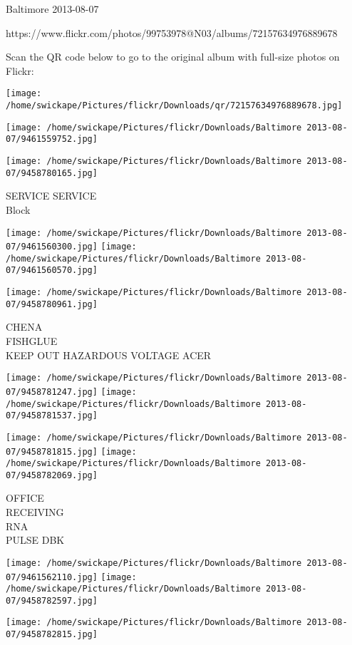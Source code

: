 \documentclass[10pt,letterpaper]{article}
\begin{document}
Baltimore 2013-08-07

https://www.flickr.com/photos/99753978@N03/albums/72157634976889678

Scan the QR code below to go to the original album with full-size photos on Flickr:

\texttt{[image: /home/swickape/Pictures/flickr/Downloads/qr/72157634976889678.jpg]}
\pagebreak

\texttt{[image: /home/swickape/Pictures/flickr/Downloads/Baltimore 2013-08-07/9461559752.jpg]}

\vspace{0.25in}
\texttt{[image: /home/swickape/Pictures/flickr/Downloads/Baltimore 2013-08-07/9458780165.jpg]}

SERVICE SERVICE\\
Block
\pagebreak

\texttt{[image: /home/swickape/Pictures/flickr/Downloads/Baltimore 2013-08-07/9461560300.jpg]}
\texttt{[image: /home/swickape/Pictures/flickr/Downloads/Baltimore 2013-08-07/9461560570.jpg]}

\vspace{0.25in}
\texttt{[image: /home/swickape/Pictures/flickr/Downloads/Baltimore 2013-08-07/9458780961.jpg]}

CHENA\\
FISHGLUE\\
KEEP OUT HAZARDOUS VOLTAGE ACER
\pagebreak

\texttt{[image: /home/swickape/Pictures/flickr/Downloads/Baltimore 2013-08-07/9458781247.jpg]}
\texttt{[image: /home/swickape/Pictures/flickr/Downloads/Baltimore 2013-08-07/9458781537.jpg]}

\texttt{[image: /home/swickape/Pictures/flickr/Downloads/Baltimore 2013-08-07/9458781815.jpg]}
\texttt{[image: /home/swickape/Pictures/flickr/Downloads/Baltimore 2013-08-07/9458782069.jpg]}

OFFICE\\
RECEIVING\\
RNA\\
PULSE DBK
\pagebreak

\texttt{[image: /home/swickape/Pictures/flickr/Downloads/Baltimore 2013-08-07/9461562110.jpg]}
\texttt{[image: /home/swickape/Pictures/flickr/Downloads/Baltimore 2013-08-07/9458782597.jpg]}

\texttt{[image: /home/swickape/Pictures/flickr/Downloads/Baltimore 2013-08-07/9458782815.jpg]}
\end{document}
